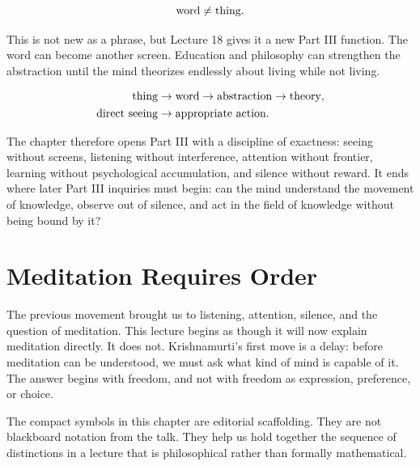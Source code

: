 \documentclass[11pt,oneside]{book}
\begin{document}
\begin{equation}
\hbox{word} \neq \hbox{thing}.
\end{equation}

This is not new as a phrase, but Lecture 18 gives it a new Part III function. The word can become another screen. Education and philosophy can strengthen the abstraction until the mind theorizes endlessly about living while not living.

\begin{align}
\hbox{thing}
&\to
\hbox{word}
\to
\hbox{abstraction}
\to
\hbox{theory},\\
\hbox{direct seeing}
&\to
\hbox{appropriate action}.
\end{align}

The chapter therefore opens Part III with a discipline of exactness: seeing without screens, listening without interference, attention without frontier, learning without psychological accumulation, and silence without reward. It ends where later Part III inquiries must begin: can the mind understand the movement of knowledge, observe out of silence, and act in the field of knowledge without being bound by it?


\chapter{Meditation Requires Order}

The previous movement brought us to listening, attention, silence, and the question of meditation. This lecture begins as though it will now explain meditation directly. It does not. Krishnamurti's first move is a delay: before meditation can be understood, we must ask what kind of mind is capable of it. The answer begins with freedom, and not with freedom as expression, preference, or choice.

The compact symbols in this chapter are editorial scaffolding. They are not blackboard notation from the talk. They help us hold together the sequence of distinctions in a lecture that is philosophical rather than formally mathematical.
\end{document}
